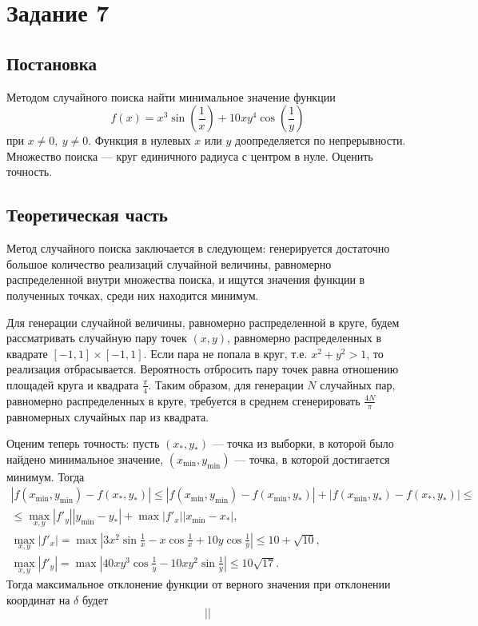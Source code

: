 \documentclass[12pt, a4paper]{article}
\begin{document}
\section{Задание 7}
\subsection{Постановка}
	Методом случайного поиска найти минимальное значение функции 
	\[ f(x)= x^3\sin\left( \frac 1{x} \right) + 10xy^4\cos\left( \frac 1 {y} \right) \]
	при $x\neq 0,\ y\neq 0$. Функция в нулевых $x$ или $y$ доопределяется по непрерывности.
	Множество поиска --- круг единичного радиуса с центром в нуле. Оценить точность.
\subsection{Теоретическая часть}
Метод случайного поиска заключается в следующем: генерируется достаточно большое количество реализаций случайной величины, равномерно распределенной внутри множества поиска, и ищутся значения функции в полученных точках, среди них находится минимум.

Для генерации случайной величины, равномерно распределенной в круге, будем рассматривать случайную пару точек $(x,y)$, равномерно распределенных в квадрате $[-1,1]\times [-1,1]$. Если пара не попала в круг, т.е. $x^2+y^2>1$, то реализация отбрасывается. Вероятность отбросить пару точек равна отношению площадей круга и квадрата $\frac{\pi}{4}$. Таким образом, для генерации $N$ случайных пар, равномерно распределенных в круге, требуется в среднем сгенерировать $\frac{4N}{\pi}$ равномерных случайных пар из квадрата. 

Оценим теперь точность: пусть $\left(x_*,y_*\right)$ --- точка из выборки, в которой было найдено минимальное значение, $(x_{\min},y_{\min})$ --- точка, в которой достигается минимум. Тогда
\begin{gather*} \left| f(x_{\min} , y_{\min}) - f(x_*,y_*) \right| 
	\leqslant \left| 
	f\left(x_{\min},y_{\min}\right) - f\left(x_{\min},y_*\right)\right| + \left| f\left(x_{\min},y_*\right) - f\left(x_*,y_*\right)  \right| 
	\leqslant \\ \leqslant
	\max\limits_{x,y} \left|f'_{y}\right|\left| y_{\min}-y_*\right| + \max \left|f'_x\right|\left| x_{\min}-x_* \right|, \\
	\max\limits_{x,y} \left|f'_x\right| = \max \left| 3x^2\sin\frac1{x} - x\cos\frac1{x}+10y\cos\frac1y \right|  \leqslant 10 + \sqrt{10}, \\
	\max\limits_{x,y}\left|f'_y\right| = \max \left| 40xy^3\cos\frac1y -10xy^2\sin\frac1y \right| \leqslant 10\sqrt{17}. 
\end{gather*}
Тогда максимальное отклонение функции от верного значения при отклонении координат на $\delta$ будет 
\[ \left|  \right| \]

\newpage



\end{document}
